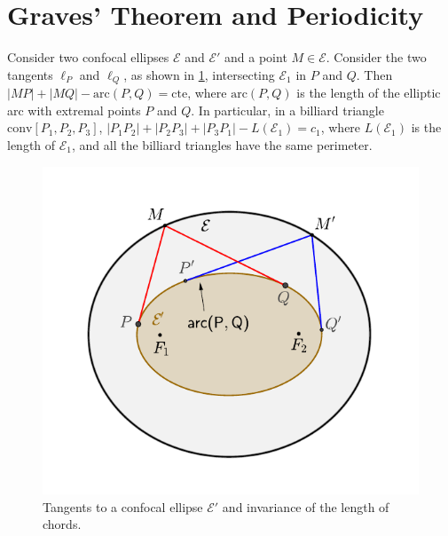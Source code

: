 \section{Graves' Theorem and Periodicity}

 \begin{proposition} 
 	  \label{prop:dar1} Consider two confocal ellipses $\mathcal E$ and $\mathcal{E}'$ and a point $M\in\mathcal E$. Consider the   two tangents $\ell_P$ and $\ell_Q$,  as shown in   \cref{fig:da_cordas}, intersecting $\mathcal{E}_1$ in $P$ and $Q$. Then $|MP|+|MQ|-\text{arc}{(P,Q)}=\mathrm{cte}$, where $\text{arc}(P,Q)$ is the length of the elliptic arc with extremal points   $P$ and $Q$. In particular, in a   billiard triangle $\text{conv}[P_1,P_2,P_3]$,  $|P_1P_2|+|P_2P_3|+|P_3P_1|-L(\mathcal{E}_1  )=  c_1$, where $L(\mathcal{E}_1) $ is the length of $\mathcal{E}_1$, and all the billiard triangles have the same perimeter.
 	
 \end{proposition}
 \begin{figure}
 \begin{center}
   \includegraphics[scale=0.7]{chap_09/pics/pics_09_020_graves.pdf}
		\caption{ Tangents to a confocal  ellipse $\mathcal{E}'$ and invariance of the length of chords.}
		\label{fig:da_cordas}
 	\end{center}
\end{figure}
 

